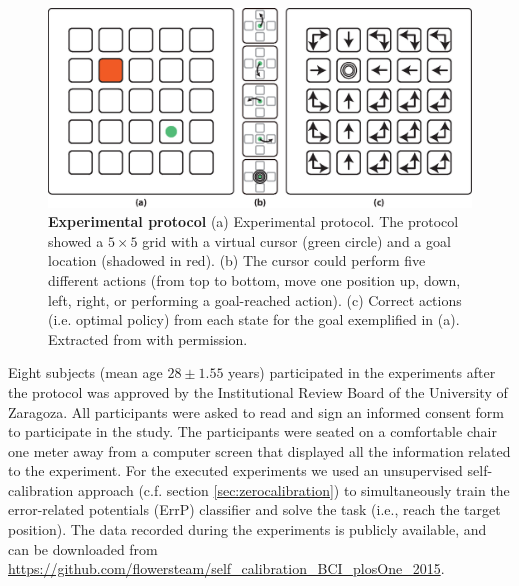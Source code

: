 \begin{figure}[!tbp]
\centering
\includegraphics[width=\columnwidth]{figures/experimentalProtocol.eps}
\caption{\label{fig:protocol} \textbf{Experimental protocol} (a) Experimental protocol. The protocol showed a $5\times5$ grid with a virtual cursor (green circle) and a goal location (shadowed in red). (b) The cursor could perform five different actions (from top to bottom, move one position up, down, left, right, or performing a goal-reached action). (c) Correct actions (i.e. optimal policy) from each state for the goal exemplified in (a). Extracted from \cite{iturrate13} with permission.}
\end{figure}


Eight subjects (mean age $28 \pm 1.55$ years) participated in the experiments after the protocol was approved by the Institutional Review Board of the University of Zaragoza. All participants were asked to read and sign an informed consent form to participate in the study. The participants were seated on a comfortable chair one meter away from a computer screen that displayed all the information related to the experiment.
%
%
For the executed experiments we used an unsupervised self-calibration approach (c.f. section \ref{sec:zerocalibration}) to simultaneously train the error-related potentials (ErrP) \cite{chavarriaga2014errare} classifier  and solve the task (i.e., reach the target position). The data recorded during the experiments is publicly available, and can be downloaded from \url{https://github.com/flowersteam/self_calibration_BCI_plosOne_2015}.

